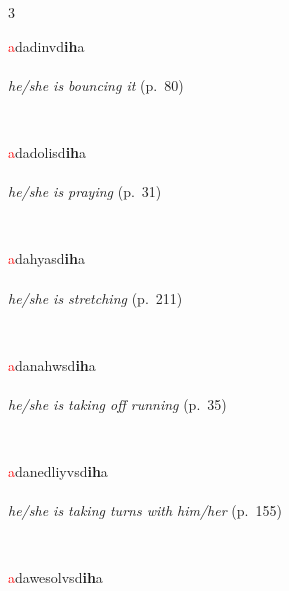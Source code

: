 \documentclass[oneside,openany]{book}%
\begin{document}
\noindent\begin{multicols}{3}%
\begin{minipage}[t]{\linewidth}
\raggedright\noindent \textcolor{Red}{a}dadinvd\textbf{ih}a\\
\\
\noindent \textit{he/she is bouncing it} (p.~80)
\end{minipage}\\[1em]%
\begin{minipage}[t]{\linewidth}
\raggedright\noindent \textcolor{Red}{a}dadolisd\textbf{ih}a\\
\\
\noindent \textit{he/she is praying} (p.~31)
\end{minipage}\\[1em]%
\begin{minipage}[t]{\linewidth}
\raggedright\noindent \textcolor{Red}{a}dahyasd\textbf{ih}a\\
\\
\noindent \textit{he/she is stretching} (p.~211)
\end{minipage}\\[1em]%
\begin{minipage}[t]{\linewidth}
\raggedright\noindent \textcolor{Red}{a}danahwsd\textbf{ih}a\\
\\
\noindent \textit{he/she is taking off running} (p.~35)
\end{minipage}\\[1em]%
\begin{minipage}[t]{\linewidth}
\raggedright\noindent \textcolor{Red}{a}danedliyvsd\textbf{ih}a\\
\\
\noindent \textit{he/she is taking turns with him/her} (p.~155)
\end{minipage}\\[1em]%
\begin{minipage}[t]{\linewidth}
\raggedright\noindent \textcolor{Red}{a}dawesolvsd\textbf{ih}a\\
\\

\end{minipage}
\end{multicols}
\end{document}
